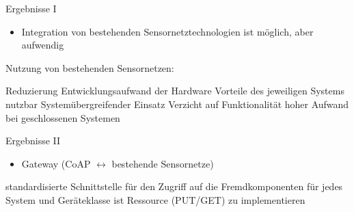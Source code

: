 
\begin{frame}{\insertsubsection}{Ergebnisse I}
	\begin{itemize}
	\item 	Integration von bestehenden Sensornetztechnologien ist möglich, aber aufwendig
	\end{itemize}
	\vspace{1em}
	Nutzung von bestehenden Sensornetzen:
	\begin{proconlist}
	\pro 	Reduzierung Entwicklungsaufwand der Hardware
	\pro 	Vorteile des jeweiligen Systems nutzbar
	\pro 	Systemübergreifender Einsatz
	\contra Verzicht auf Funktionalität
	\contra hoher Aufwand bei geschlossenen Systemen
	\end{proconlist}
\end{frame}


\begin{frame}{\insertsubsection}{Ergebnisse II}
	\begin{itemize}
	\item 	Gateway (CoAP $ \leftrightarrow $ bestehende Sensornetze)
	\end{itemize}
	\vspace{1em}
	\begin{proconlist}
	\pro 	standardisierte Schnittstelle für den Zugriff auf die Fremdkomponenten
	\contra für jedes System und Geräteklasse ist Ressource (PUT/GET) zu implementieren
	\end{proconlist}
\end{frame}
